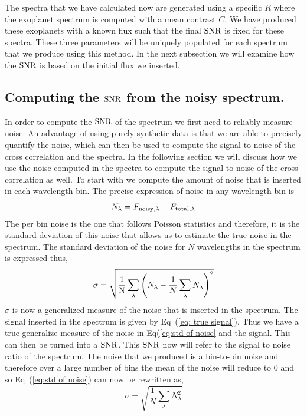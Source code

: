 The spectra that we have calculated now are generated using a specific $R$ where the exoplanet spectrum is computed with a mean contrast $C$. 
We have produced these exoplanets with a known flux such that the final $\rm{SNR}$ is fixed for these spectra.
These three parameters will be uniquely populated for each spectrum that we produce using this method.
In the next subsection we will examine how the $\rm{SNR}$ is based on the initial flux we inserted.
\subsection{Computing the $\rm{SNR}$ from the noisy spectrum.}
In order to compute the $\rm{SNR}$ of the spectrum we  first need to reliably measure noise. 
An advantage of using purely synthetic data is that we are able to precisely quantify the noise, which can then be used to compute the signal to noise of the cross correlation and the spectra.
In the following section we will discuss how we use the noise computed in the spectra to compute the signal to noise of the cross correlation as well.
To start with we compute the amount of noise that is inserted in each wavelength bin.
The precise expression of noise in any wavelength bin is 
\begin{equation}
    N_\lambda = F_{\rm{noisy,\lambda}}- F_{\rm{total,\lambda}}
\end{equation}
The per bin noise is the one that follows Poisson statistics and therefore, it is the standard deviation of this noise that allows us to estimate the true noise in the spectrum.
The standard deviation of the noise for $N$ wavelengths in the spectrum is expressed thus,
\begin{equation}
    \sigma = \sqrt{\dfrac{1}{\rm{N}}\sum\limits_{\lambda}\left(N_\lambda-
    \dfrac{1}{N}\sum\limits_{\lambda} N_{\lambda}\right)^2}
    \label{eq:std of noise}
\end{equation}
$\sigma$ is now a generalized measure of the noise that is inserted in the spectrum.
The signal inserted in the spectrum is given by Eq~(\ref{eq: true signal}).
Thus we have a true generalize measure of the noise in Eq(\ref{eq:std of noise} and the signal.
This can then be turned into a $\rm{SNR}$.
This $\rm{SNR}$ now will refer to the signal to noise ratio of the spectrum. 
The noise that we produced is a bin-to-bin noise and therefore over a large number of bins the mean of the noise will reduce to $0$ and so Eq~(\ref{eq:std of noise}) can now be rewritten as,
\begin{equation}
    \sigma = \sqrt{\dfrac{1}{N}\sum\limits_\lambda N^2_\lambda}
\end{equation}
